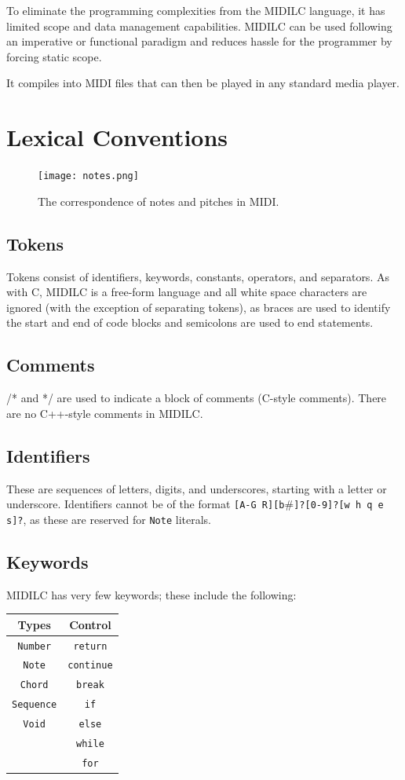 \documentclass[12pt,A4]{book}
\begin{document}
To eliminate the programming complexities from the MIDILC language, it has limited scope and data management capabilities.  MIDILC can be used following an imperative or functional paradigm and reduces hassle for the programmer by forcing static scope.

It compiles into MIDI files that can then be played in any standard media player.

\section{Lexical Conventions}
\begin{figure}
\center
\texttt{[image: notes.png]}
\label{fig:pitches_and_notes}
\caption{The correspondence of notes and pitches in MIDI. }
\end{figure}
\subsection{Tokens}
Tokens consist of identifiers, keywords, constants, operators, and separators.  As with C, MIDILC is a free-form language and all white space characters are ignored (with the exception of separating tokens), as braces are used to identify the start and end of code blocks and semicolons are used to end statements.
\subsection{Comments}
/* and */ are used to indicate a block of comments (C-style comments).  There are no C++-style comments in MIDILC.
\subsection{Identifiers}
These are sequences of letters, digits, and underscores, starting with a letter or underscore.  Identifiers cannot be of the format \verb|[A-G R][b|\#\verb|]?[0-9]?[w h q e s]?|, as these are reserved for \verb|Note| literals.
\subsection{Keywords}
MIDILC has very few keywords; these include the following:

\begin{tabular}{|c|c|}
\hline
Types & Control \\ \hline
\verb|Number| & \verb|return| \\ \hline
\verb|Note|	& \verb|continue| \\ \hline
\verb|Chord| & \verb|break| \\ \hline
\verb|Sequence|	& \verb|if| \\ \hline
\verb|Void|	& \verb|else| \\ \hline
	& \verb|while| \\ \hline
	& \verb|for| \\ \hline
\end{tabular}
\end{document}
